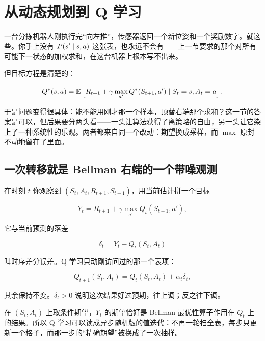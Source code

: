 \section{从动态规划到 Q 学习}
\label{sec:16-Control-and-Reinforcement-Learning/02-Reinforcement-Learning/04}

一台分拣机器人刚执行完``向左推''，传感器返回一个新位姿和一个奖励数字。就这些。你手上没有 \(P(s'\mid s,a)\) 这张表，也永远不会有——上一节要求的那个对所有可能下一状态的加权求和，在这台机器上根本写不出来。

但目标方程是清楚的：

\[
Q^*(s,a)
=
\mathbb{E}\left[
R_{t+1}+\gamma\max_{a'}Q^*(S_{t+1},a')
\mid S_t=s,A_t=a
\right].
\]

于是问题变得很具体：能不能用刚才那一个样本，顶替右端那个求和？这一节的答案是可以，但后果要分两头看——一头让算法获得了离策略的自由，另一头让它染上了一种系统性的乐观。两者都来自同一个改动：期望换成采样，而 \(\max\) 原封不动地留在了里面。

\subsection{一次转移就是 Bellman 右端的一个带噪观测}

在时刻 \(t\) 你观察到 \((S_t,A_t,R_{t+1},S_{t+1})\)，用当前估计拼一个目标

\[
Y_t=R_{t+1}+\gamma\max_{a'}Q_t(S_{t+1},a'),
\]

它与当前预测的落差

\[
\delta_t=Y_t-Q_t(S_t,A_t)
\]

叫时序差分误差。Q 学习只动刚访问过的那一个表项：

\[
Q_{t+1}(S_t,A_t)=Q_t(S_t,A_t)+\alpha_t\delta_t,
\]

其余保持不变。\(\delta_t>0\) 说明这次结果好过预期，往上调；反之往下调。

在 \((S_t,A_t)\) 上取条件期望，\(Y_t\) 的期望恰好是 Bellman 最优性算子作用在 \(Q_t\) 上的结果。所以 Q 学习可以读成异步随机版的值迭代：不再一轮扫全表，每步只更新一个格子，而那一步的``精确期望''被换成了一次抽样。

